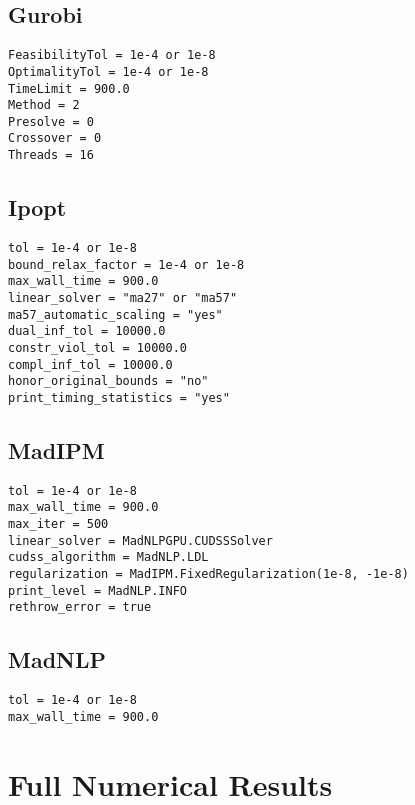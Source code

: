 \documentclass{article}
\begin{document}
\subsection{Gurobi}
\begin{lstlisting}
FeasibilityTol = 1e-4 or 1e-8
OptimalityTol = 1e-4 or 1e-8
TimeLimit = 900.0
Method = 2 
Presolve = 0
Crossover = 0
Threads = 16
\end{lstlisting}
\subsection{Ipopt}
\begin{lstlisting}
tol = 1e-4 or 1e-8
bound_relax_factor = 1e-4 or 1e-8
max_wall_time = 900.0
linear_solver = "ma27" or "ma57"
ma57_automatic_scaling = "yes"
dual_inf_tol = 10000.0
constr_viol_tol = 10000.0
compl_inf_tol = 10000.0
honor_original_bounds = "no"
print_timing_statistics = "yes"
\end{lstlisting}
\subsection{MadIPM}
\begin{lstlisting}
tol = 1e-4 or 1e-8
max_wall_time = 900.0
max_iter = 500
linear_solver = MadNLPGPU.CUDSSSolver
cudss_algorithm = MadNLP.LDL
regularization = MadIPM.FixedRegularization(1e-8, -1e-8)
print_level = MadNLP.INFO
rethrow_error = true
\end{lstlisting}
\subsection{MadNLP}
\begin{lstlisting}
tol = 1e-4 or 1e-8
max_wall_time = 900.0
\end{lstlisting}
\section{Full Numerical Results}
 




\end{document}
